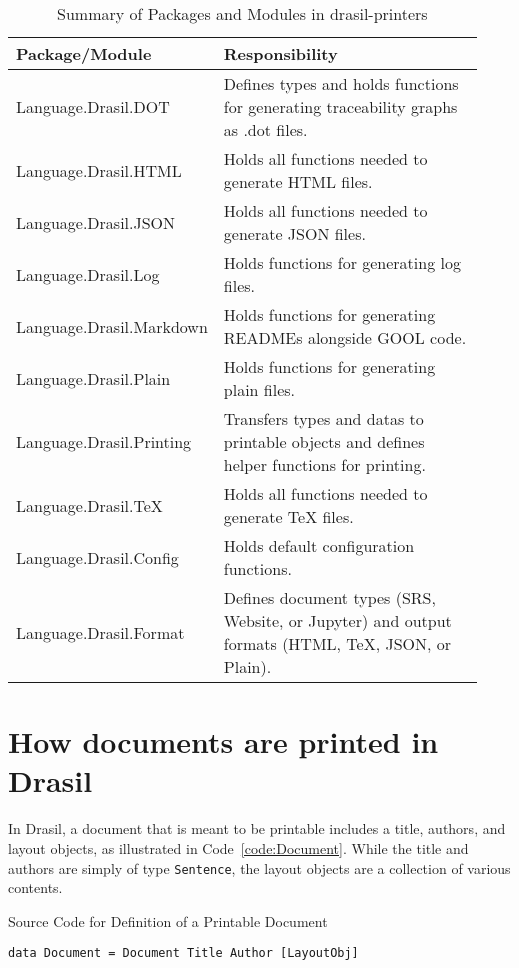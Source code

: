 \begin{longtable}[c]{|>{\raggedright}p{0.32\linewidth}|>{\raggedright\arraybackslash}p{0.61\linewidth}|}
	\caption{Summary of Packages and Modules in drasil-printers} 
	\label{tab:printerpacks}                                              
	\\ \hline
	
	\rowcolor{McMasterMediumGrey}
	\textbf{Package/Module} & \textbf{Responsibility}
	\\ \hline
	
	Language.Drasil.DOT & Defines types and holds functions for generating 
	traceability graphs as .dot files. 
	\\ \hline
	Language.Drasil.HTML & Holds all functions needed to generate HTML files. 
	\\ \hline
	Language.Drasil.JSON & Holds all functions needed to generate JSON files. 
	\\ \hline
	Language.Drasil.Log & Holds functions for generating log files. 
	\\ \hline
	Language.Drasil.Markdown & Holds functions for generating READMEs alongside 
	GOOL code.
	\\ \hline
	Language.Drasil.Plain & Holds functions for generating plain files.
	\\ \hline
	Language.Drasil.Printing & Transfers types and datas to printable objects 
	and defines helper functions for printing.
	\\ \hline
	Language.Drasil.TeX & Holds all functions needed to generate TeX files. 
	\\ \hline
	Language.Drasil.Config & Holds default configuration functions. 
	\\ \hline
	Language.Drasil.Format & Defines document types (SRS, Website, or Jupyter) 
	and output formats (HTML, TeX, JSON, or Plain).
	\\ \hline
\end{longtable}

\section{How documents are printed in Drasil}
In Drasil, a document that is meant to be printable includes a title, authors, 
and layout objects, as illustrated in Code~\ref{code:Document}. While the title 
and authors are simply of type \texttt{Sentence}, the layout objects are a 
collection of various contents.

\begin{listing}[h]
	\caption{Source Code for Definition of a Printable Document}
	\label{code:Document}
	\begin{lstlisting}[language=haskell1]
		data Document = Document Title Author [LayoutObj]
	\end{lstlisting}
\end{listing}

